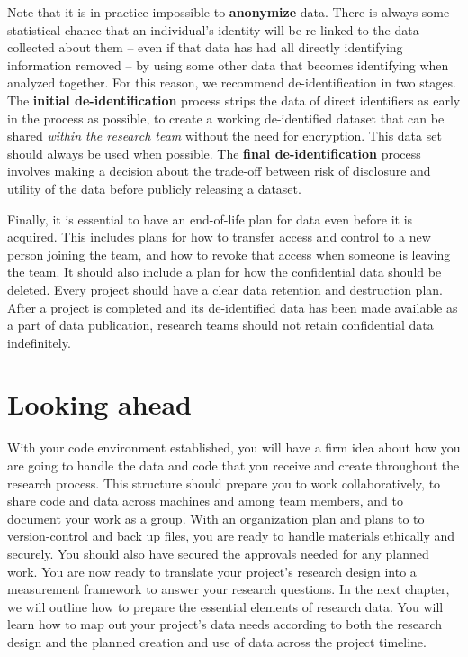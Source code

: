 Note that it is in practice impossible 
to \textbf{anonymize} data.
There is always some statistical chance that an individual's identity
will be re-linked to the data collected about them
-- even if that data has had all directly identifying information removed --
by using some other data that becomes identifying when analyzed together.
For this reason, we recommend de-identification in two stages.
The \textbf{initial de-identification} process strips the data of direct identifiers
as early in the process as possible,
to create a working de-identified dataset that
can be shared \textit{within the research team} without the need for encryption.
This data set should always be used when possible.
The \textbf{final de-identification} process involves
making a decision about the trade-off between
risk of disclosure and utility of the data
before publicly releasing a dataset.

Finally, it is essential to have an end-of-life plan for data even before it is acquired.
This includes plans for how to transfer access and control to a new person joining the team,
and how to revoke that access when someone is leaving the team.
It should also include a plan for how the confidential data should be deleted.
Every project should have a clear data retention and destruction plan.
After a project is completed and its
de-identified data has been made available as a part of data publication,
research teams should not retain confidential data indefinitely.

\section{Looking ahead}
With your code environment established,
you will have a firm idea about how you are going to
handle the data and code that
you receive and create throughout the research process.
This structure should prepare you to work collaboratively,
to share code and data across machines and among team members,
and to document your work as a group.
With an organization plan
and plans to to version-control and back up files,
you are ready to handle materials ethically and securely.
You should also have secured the approvals needed for any planned work.
You are now ready to translate your project's research design into a measurement framework
to answer your research questions.
In the next chapter,
we will outline how to prepare the essential elements of research data.
You will learn how to map out your project's data needs
according to both the research design
and the planned creation and use of data across the project timeline.
